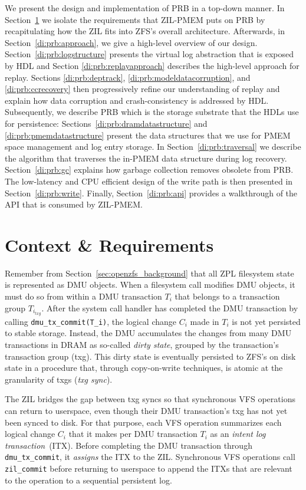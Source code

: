 \documentclass[12pt,a4paper,twoside]{book}
\begin{document}
We present the design and implementation of PRB in a top-down manner.
In Section~\ref{di:prb:analysis} we isolate the requirements that ZIL-PMEM puts on PRB by recapitulating how the ZIL fits into ZFS's overall architecture.
Afterwards, in Section~\ref{di:prb:approach}, we give a high-level overview of our design.
Section~\ref{di:prb:logstructure} presents the virtual log abstraction that is exposed by HDL and Section \ref{di:prb:replayapproach} describes the high-level approach for replay.
Sections \ref{di:prb:deptrack}, \ref{di:prb:modeldatacorruption}, and \ref{di:prb:ccrecovery} then progressively refine our understanding of replay and explain how data corruption and crash-consistency is addressed by HDL.
Subsequently, we describe PRB which is the storage substrate that the HDLs use for persistence:
Sections~\ref{di:prb:dramdatastructure} and \ref{di:prb:pmemdatastructure} present the data structures that we use for PMEM space management and log entry storage.
In Section~\ref{di:prb:traversal} we describe the algorithm that traverses the in-PMEM data structure during log recovery.
Section~\ref{di:prb:gc} explains how garbage collection removes obsolete from PRB.
The low-latency and CPU efficient design of the write path is then presented in Section~\ref{di:prb:write}.
Finally, Section~\ref{di:prb:api} provides a walkthrough of the API that is consumed by ZIL-PMEM.

\section{Context \& Requirements}\label{di:prb:analysis}

Remember from Section~\ref{sec:openzfs_background} that all ZPL filesystem state is represented as DMU objects.
When a filesystem call modifies DMU objects, it must do so from within a DMU transaction $T_i$ that belongs to a transaction group $T_{i_{txg}}$.
After the system call handler has completed the DMU transaction by calling \lstinline{dmu_tx_commit(T_i)}, the logical change $C_i$ made in $T_i$ is not yet persisted to stable storage.
Instead, the DMU accumulates the changes from many DMU transactions in DRAM as so-called \textit{dirty state}, grouped by the transaction's transaction group (txg).
This dirty state is eventually persisted to ZFS's on disk state in a procedure that, through copy-on-write techniques, is atomic at the granularity of txgs (\textit{txg sync}).

The ZIL bridges the gap between txg syncs so that synchronous VFS operations can return to userspace, even though their DMU transaction's txg has not yet been synced to disk.
For that purpose, each VFS operation summarizes each logical change $C_i$ that it makes per DMU transaction $T_i$ as an \textit{intent log transaction}~(ITX).
Before completing the DMU transaction through \lstinline{dmu_tx_commit}, it \textit{assigns} the ITX to the ZIL.
Synchronous VFS operations call \lstinline{zil_commit} before returning to userspace to append the ITXs that are relevant to the operation to a sequential persistent log.
\end{document}
